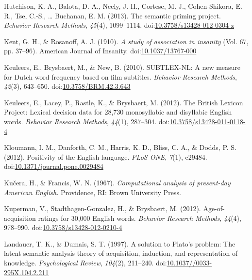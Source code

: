\documentclass[english,,man]{apa6}
\theoremstyle{definition}
\theoremstyle{definition}
\theoremstyle{definition}
\theoremstyle{remark}
\begin{document}
\leavevmode\hypertarget{ref-Hutchison2013}{}%
Hutchison, K. A., Balota, D. A., Neely, J. H., Cortese, M. J.,
Cohen-Shikora, E. R., Tse, C.-S., \ldots{} Buchanan, E. M. (2013). The
semantic priming project. \emph{Behavior Research Methods},
\emph{45}(4), 1099--1114.
doi:\href{https://doi.org/10.3758/s13428-012-0304-z}{10.3758/s13428-012-0304-z}

\leavevmode\hypertarget{ref-Kent1910a}{}%
Kent, G. H., \& Rosanoff, A. J. (1910). \emph{A study of association in
insanity} (Vol. 67, pp. 37--96). American Journal of Insanity.
doi:\href{https://doi.org/10.1037/13767-000}{10.1037/13767-000}

\leavevmode\hypertarget{ref-Keuleers2010}{}%
Keuleers, E., Brysbaert, M., \& New, B. (2010). SUBTLEX-NL: A new
measure for Dutch word frequency based on film subtitles. \emph{Behavior
Research Methods}, \emph{42}(3), 643--650.
doi:\href{https://doi.org/10.3758/BRM.42.3.643}{10.3758/BRM.42.3.643}

\leavevmode\hypertarget{ref-Keuleers2012}{}%
Keuleers, E., Lacey, P., Rastle, K., \& Brysbaert, M. (2012). The
British Lexicon Project: Lexical decision data for 28,730 monosyllabic
and disyllabic English words. \emph{Behavior Research Methods},
\emph{44}(1), 287--304.
doi:\href{https://doi.org/10.3758/s13428-011-0118-4}{10.3758/s13428-011-0118-4}

\leavevmode\hypertarget{ref-Kloumann2012}{}%
Kloumann, I. M., Danforth, C. M., Harris, K. D., Bliss, C. A., \& Dodds,
P. S. (2012). Positivity of the English language. \emph{PLoS ONE},
\emph{7}(1), e29484.
doi:\href{https://doi.org/10.1371/journal.pone.0029484}{10.1371/journal.pone.0029484}

\leavevmode\hypertarget{ref-Kucera1967}{}%
Kučera, H., \& Francis, W. N. (1967). \emph{Computational analysis of
present-day American English.} Providence, RI: Brown University Press.

\leavevmode\hypertarget{ref-Kuperman2012}{}%
Kuperman, V., Stadthagen-Gonzalez, H., \& Brysbaert, M. (2012).
Age-of-acquisition ratings for 30,000 English words. \emph{Behavior
Research Methods}, \emph{44}(4), 978--990.
doi:\href{https://doi.org/10.3758/s13428-012-0210-4}{10.3758/s13428-012-0210-4}

\leavevmode\hypertarget{ref-Landauer1997}{}%
Landauer, T. K., \& Dumais, S. T. (1997). A solution to Plato's problem:
The latent semantic analysis theory of acquisition, induction, and
representation of knowledge. \emph{Psychological Review}, \emph{104}(2),
211--240.
doi:\href{https://doi.org/10.1037//0033-295X.104.2.211}{10.1037//0033-295X.104.2.211}
\end{document}
